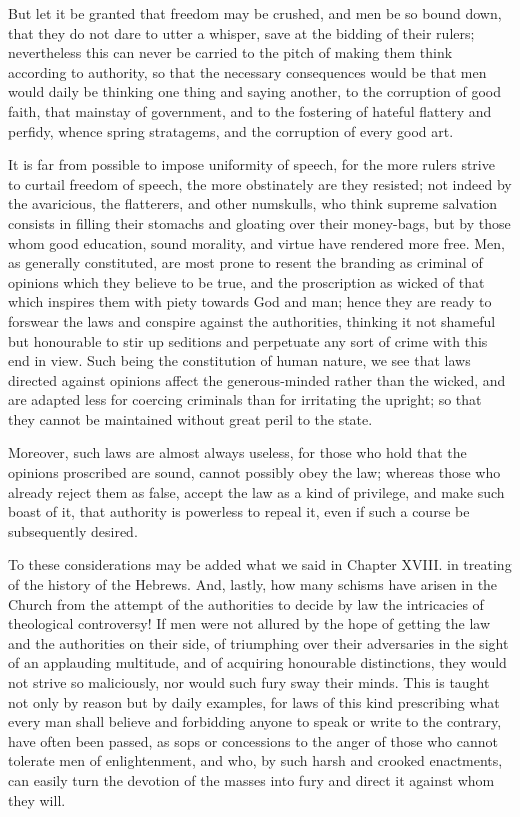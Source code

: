But let it be granted that freedom may be crushed, and men be so bound
down, that they do not dare to utter a whisper, save at the bidding of
their rulers; nevertheless this can never be carried to the pitch of
making them think according to authority, so that the necessary
consequences would be that men would daily be thinking one thing and
saying another, to the corruption of good faith, that mainstay of
government, and to the fostering of hateful flattery and perfidy,
whence spring stratagems, and the corruption of every good art.

It is far from possible to impose uniformity of speech, for the more
rulers strive to curtail freedom of speech, the  more
obstinately are they resisted; not indeed by the avaricious, the
flatterers, and other numskulls, who think supreme salvation consists
in filling their stomachs and gloating over their money-bags, but by
those whom good education, sound morality, and virtue have rendered
more free. Men, as generally constituted, are most prone to resent the
branding as criminal of opinions which they believe to be true, and
the proscription as wicked of that which inspires them with piety
towards God and man; hence they are ready to forswear the laws and
conspire against the authorities, thinking it not shameful but
honourable to stir up seditions and perpetuate any sort of crime with
this end in view. Such being the constitution of human nature, we see
that laws directed against opinions affect the generous-minded rather
than the wicked, and are adapted less for coercing criminals than for
irritating the upright; so that they cannot be maintained without
great peril to the state.

Moreover, such laws are almost always useless, for those who hold that
the opinions proscribed are sound, cannot possibly obey the law;
whereas those who already reject them as false, accept the law as a
kind of privilege, and make such boast of it, that authority is
powerless to repeal it, even if such a course be subsequently desired.

To these considerations may be added what we said in Chapter XVIII. in
treating of the history of the Hebrews. And, lastly, how many schisms
have arisen in the Church from the attempt of the authorities to
decide by law the intricacies of theological controversy! If men were
not allured by the hope of getting the law and the authorities on
their side, of triumphing over their adversaries in the sight of an
applauding multitude, and of acquiring honourable distinctions, they
would not strive so maliciously, nor would such fury sway their minds.
This is taught not only by reason but by daily examples, for laws of
this kind prescribing what every man shall believe and forbidding
anyone to speak or write to the contrary, have often been passed, as
sops or concessions to the anger of those who cannot tolerate men of
enlightenment, and who, by such harsh and crooked enactments, can
easily turn the devotion of the masses into fury and direct it against
whom they will.

